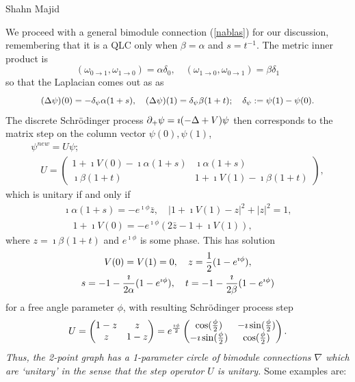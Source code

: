 \begin{artengenv}{Shahn Majid}
\begin{example}
We proceed with a general bimodule connection (\ref{nablas}) for our discussion, remembering that it is a QLC only when $\beta=\alpha$ and $s=t^{-1}$. The metric inner product is
\[ (\omega_{0\to 1},\omega_{1\to 0})=\alpha\delta_0,\quad (\omega_{1\to 0},\omega_{0\to 1})=\beta\delta_1\]
so that the Laplacian comes out as as
\[ \scalemath{0.93}{(\Delta\psi)(0)=-\delta_\psi\alpha(1+s),\quad (\Delta\psi)(1)=\delta_\psi \beta(1+t);\quad \delta_\psi:=\psi(1)-\psi(0).}\]
The discrete Schr\"odinger process ${\partial}_+\psi=\imath(-\Delta+V)\psi$ then corresponds to the matrix step on the column vector $\psi(0),\psi(1)$,
\[\begin{gathered}
\psi^{new}=U\psi;\\
\quad U= \begin{pmatrix} 1+\imath V(0) -\imath\alpha(1+s) & \imath\alpha(1+s)\\ \imath\beta(1+t) & 1+ \imath V(1) - \imath\beta(1+t)\end{pmatrix},
\end{gathered} \]
which is unitary if and only if 
\[\begin{gathered}
\imath\alpha(1+s)=-e^{\imath\phi}\bar z,\quad |1+\imath V(1) - z |^2+ |z|^2=1,\\
\quad 1+ \imath V(0)=-e^{\imath\phi}(2 \bar z - 1+\imath V(1)),
\end{gathered}  \]
where $z=\imath\beta(1+t)$ and $e^{\imath\phi}$ is some phase. This has solution 
\begin{equation}\label{solphi}\begin{gathered}
V(0)=V(1)=0,\quad z={1\over 2}(1-e^{\imath\phi}),\\
s=-1-{\imath\over 2\alpha}(1-e^{\imath\phi}),\quad t=-1-{\imath\over 2\beta}(1-e^{\imath\phi})
\end{gathered}\end{equation}
for a free angle parameter $\phi$, with resulting Schr\"odinger process step
\begin{equation}\label{Uphi} U=\begin{pmatrix}
 1-z & z \\
 z& 1-z \\
\end{pmatrix}
=e^{\imath\phi\over 2}\begin{pmatrix}
 \cos({\phi\over 2}) & -\imath\sin({\phi\over 2})\\ -\imath\sin({\phi\over 2}) & \cos({\phi\over 2}) 
\end{pmatrix}.\end{equation}
{\em Thus, the 2-point graph has a 1-parameter circle of bimodule connections $\nabla$ which are `unitary' in the sense that the step operator $U$ is unitary.} Some examples are:


\end{example}
\end{artengenv}
